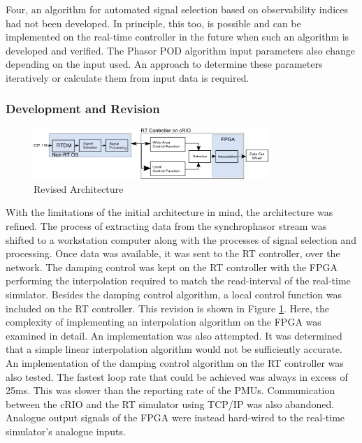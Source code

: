\documentclass[conference]{IEEEtran}
\begin{document}
Four, an algorithm for automated signal selection based on observability indices had not been developed. In principle, this too, is possible and can be implemented on the real-time controller in the future when such an algorithm is developed and verified. The Phasor POD algorithm input parameters also change depending on the input used. An approach to determine these parameters iteratively or calculate them from input data is required. %

\subsubsection{Development and Revision}
\begin{figure}[h]
\centering
\includegraphics[width=3.5in]{Revision.png}
\vspace{-0.5em}
\caption{Revised Architecture}
\label{fig:Revision}
\end{figure}

With the limitations of the initial architecture in mind, the architecture was refined. The process of  extracting data from the synchrophasor stream was shifted to a workstation computer along with the processes of signal selection and processing. Once data was available, it was sent to the RT controller, over the  network. The damping control was kept on the RT controller with the FPGA performing the interpolation required to match the read-interval of the real-time simulator. Besides the damping control algorithm, a local control function was included on the RT controller. This revision is shown in Figure \ref{fig:Revision}. Here, the complexity of implementing an interpolation algorithm on the FPGA was examined in detail. An implementation was also attempted. It was determined that a simple linear interpolation algorithm would not be sufficiently accurate. An implementation of the damping control algorithm on the RT controller was also tested. The fastest loop rate that could be achieved was always in excess of 25ms. This was slower than the reporting rate of the PMUs. Communication between the cRIO and the RT simulator using TCP/IP was also abandoned. Analogue output signals of the FPGA were instead hard-wired to the real-time simulator's analogue inputs.
\end{document}
